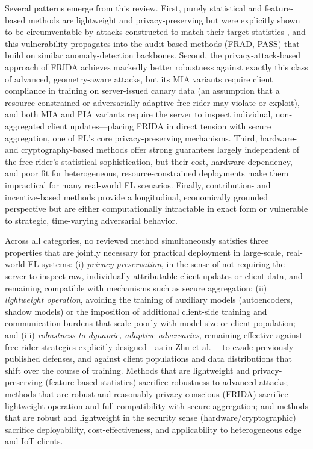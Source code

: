 Several patterns emerge from this review. First, purely statistical and feature-based methods \cite{fraboni2021freerider,lin2019freeriders} are lightweight and privacy-preserving but were explicitly shown to be circumventable by attacks constructed to match their target statistics \cite{zhu2023advanced}, and this vulnerability propagates into the audit-based methods (FRAD, PASS) that build on similar anomaly-detection backbones. Second, the privacy-attack-based approach of FRIDA \cite{recasens2024frida} achieves markedly better robustness against exactly this class of advanced, geometry-aware attacks, but its MIA variants require client compliance in training on server-issued canary data (an assumption that a resource-constrained or adversarially adaptive free rider may violate or exploit), and both MIA and PIA variants require the server to inspect individual, non-aggregated client updates—placing FRIDA in direct tension with secure aggregation, one of FL's core privacy-preserving mechanisms. Third, hardware- and cryptography-based methods offer strong guarantees largely independent of the free rider's statistical sophistication, but their cost, hardware dependency, and poor fit for heterogeneous, resource-constrained deployments make them impractical for many real-world FL scenarios. Finally, contribution- and incentive-based methods provide a longitudinal, economically grounded perspective but are either computationally intractable in exact form or vulnerable to strategic, time-varying adversarial behavior.

Across all categories, no reviewed method simultaneously satisfies three properties that are jointly necessary for practical deployment in large-scale, real-world FL systems: (i) \emph{privacy preservation}, in the sense of not requiring the server to inspect raw, individually attributable client updates or client data, and remaining compatible with mechanisms such as secure aggregation; (ii) \emph{lightweight operation}, avoiding the training of auxiliary models (autoencoders, shadow models) or the imposition of additional client-side training and communication burdens that scale poorly with model size or client population; and (iii) \emph{robustness to dynamic, adaptive adversaries}, remaining effective against free-rider strategies explicitly designed—as in Zhu et al. \cite{zhu2023advanced}—to evade previously published defenses, and against client populations and data distributions that shift over the course of training. Methods that are lightweight and privacy-preserving (feature-based statistics) sacrifice robustness to advanced attacks; methods that are robust and reasonably privacy-conscious (FRIDA) sacrifice lightweight operation and full compatibility with secure aggregation; and methods that are robust and lightweight in the security sense (hardware/cryptographic) sacrifice deployability, cost-effectiveness, and applicability to heterogeneous edge and IoT clients.

